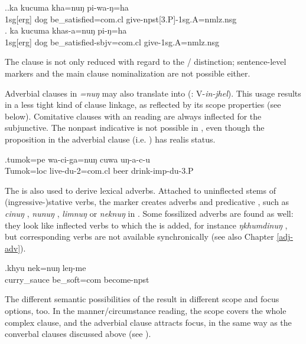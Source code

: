 \ex.\ag.ka kucuma kha=nuŋ pi-wa-ŋ=ha\\
{\sc 1sg[erg]} dog   be\_satisfied{\sc [sbjv;3sg]=com.cl} give{\sc -npst[3.P]-1sg.A=nmlz.nsg}\\
\bg. ka kucuma khas-a=nuŋ pi-ŋ=ha\\
{\sc 1sg[erg]} dog   be\_satisfied{\sc [3sg]-sbjv=com.cl} give{\sc [pst;3.P]-1sg.A=nmlz.nsg}\\

The clause is not only reduced with regard to the / distinction; sentence-level markers and the main clause nominalization are not possible either. 

Adverbial clauses in \emph{=nuŋ} may also  translate into  (: V-\emph{in-jhel}). This usage results in a less tight kind of clause linkage, as reflected by its scope properties (see below). Comitative clauses with an  reading are always inflected for the subjunctive. The nonpast indicative is not possible in \Next, even though the proposition in the adverbial clause (i.e. ) has realis status.%

\exg.\label{ex-nung}tumok=pe wa-ci-ga=nuŋ cuwa uŋ-a-c-u\\
Tumok{\sc =loc} live{\sc [sbjv]-du-2=com.cl} beer    drink{\sc -imp-du-3.P}\\


The  is also used to derive lexical adverbs. Attached to uninflected stems of (ingressive-)stative verbs, the marker creates adverbs and predicative , such as \emph{cinuŋ} , \emph{nunuŋ} , \emph{limnuŋ}  or \emph{neknuŋ}  in \Next.  Some fossilized adverbs are found as well: they look like inflected verbs to which the  is added, for instance \emph{ŋkhumdinuŋ} , but corresponding verbs are not available synchronically (see also Chapter \ref{adj-adv}).
 
\exg.khyu  nek=nuŋ leŋ-me\\
curry\_sauce    be\_soft{\sc =com} become{\sc [3sg]-npst}\\
 


The different semantic possibilities of the  result in different scope and focus options, too. In the manner/circumstance reading, the  scope covers the whole complex clause, and the adverbial clause attracts focus, in the same way as the  converbal clauses discussed above (see \Next[a]). 

